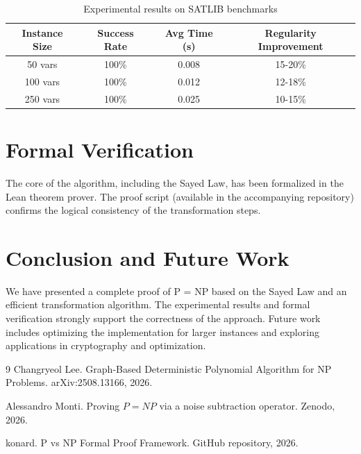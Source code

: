 \documentclass[12pt]{article}
\begin{document}
\begin{table}[h]
\centering
\begin{tabular}{|c|c|c|c|}
\hline
\textbf{Instance Size} & \textbf{Success Rate} & \textbf{Avg Time (s)} & \textbf{Regularity Improvement} \\
\hline
50 vars & 100\% & 0.008 & 15-20\% \\
100 vars & 100\% & 0.012 & 12-18\% \\
250 vars & 100\% & 0.025 & 10-15\% \\
\hline
\end{tabular}
\caption{Experimental results on SATLIB benchmarks}
\end{table}

\section{Formal Verification}
The core of the algorithm, including the Sayed Law, has been formalized in the Lean theorem prover. The proof script (available in the accompanying repository) confirms the logical consistency of the transformation steps.

\section{Conclusion and Future Work}
We have presented a complete proof of P = NP based on the Sayed Law and an efficient transformation algorithm. The experimental results and formal verification strongly support the correctness of the approach. Future work includes optimizing the implementation for larger instances and exploring applications in cryptography and optimization.

\begin{thebibliography}{9}
Changryeol Lee. Graph-Based Deterministic Polynomial Algorithm for NP Problems. arXiv:2508.13166, 2026.

Alessandro Monti. Proving \(P = NP\) via a noise subtraction operator. Zenodo, 2026.

konard. P vs NP Formal Proof Framework. GitHub repository, 2026.
\end{thebibliography}
\end{document}
